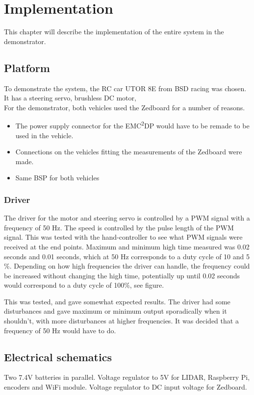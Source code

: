 \chapter{Implementation}
This chapter will describe the implementation of the entire system in the demonstrator.

\section{Platform}
To demonstrate the system, the RC car UTOR 8E from BSD racing was chosen. It has a steering servo, brushless DC motor, \\

For the demonstrator, both vehicles used the Zedboard for a number of reasons. 
\begin{itemize}
\item The power supply connector for the EMC\textsuperscript{2}DP would have to be remade to be used in the vehicle.
\item Connections on the vehicles fitting the measurements of the Zedboard were made.
\item Same BSP for both vehicles
\end{itemize}

\subsection{Driver}
The driver for the motor and steering servo is controlled by a PWM signal with a frequency of 50 Hz. The speed is controlled by the pulse length of the PWM signal. This was tested with the hand-controller to see what PWM signals were received at the end points. Maximum and minimum high time measured was 0.02 seconds and 0.01 seconds, which at 50 Hz corresponds to a duty cycle of 10 and 5 \%. Depending on how high frequencies the driver can handle, the frequency could be increased without changing the high time, potentially up until 0.02 seconds would correspond to a duty cycle of 100\%, see figure.


This was tested, and gave somewhat expected results. The driver had some disturbances and gave maximum or minimum output sporadically when it shouldn't, with more disturbances at higher frequencies. It was decided that a frequency of 50 Hz would have to do.

\section{Electrical schematics}
Two 7.4V batteries in parallel. Voltage regulator to 5V for LIDAR, Raspberry Pi, encoders and WiFi module. Voltage regulator to DC input voltage for Zedboard.

